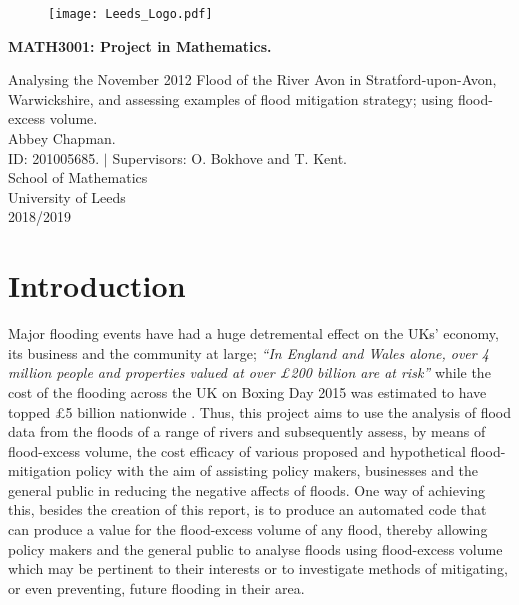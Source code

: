 \documentclass[11pt,a4paper]{article}
\begin{document}

\begin{titlepage}
\begin{center}

\begin{figure}[t]
\raggedleft
\texttt{[image: Leeds\_Logo.pdf]}
\end{figure}
 

\vspace*{5cm}
{\huge \textbf{MATH3001: Project in Mathematics.}}\\
\hrulefill

\vspace*{0.1cm}
{\LARGE Analysing the November 2012 Flood of the River Avon in Stratford-upon-Avon, Warwickshire, and assessing examples of flood mitigation strategy{;} using flood-excess volume.}\\
\vspace{1cm}
{\large Abbey Chapman.}\\
{\large ID: 201005685. $|$ Supervisors: O. Bokhove and T. Kent.}\\
\vfill
School of Mathematics\\
University of Leeds\\
2018/2019
\end{center}
\end{titlepage}

\tableofcontents 
\noindent \hrulefill

\newpage
\section{Introduction}
Major flooding events have had a huge detremental effect on the UKs' economy, its business and the community at large{;} \textit{``In England and Wales alone, over 4 million people and properties valued at over £200 billion are at risk''} \cite{foresight} while the cost of the flooding across the UK on Boxing Day 2015 was estimated to have topped \pounds5 billion nationwide \cite{telegraph}. Thus, this project aims to use the analysis of flood data from the floods of a range of rivers and subsequently assess, by means of flood-excess volume, the cost efficacy of various proposed and hypothetical flood-mitigation policy with the aim of assisting policy makers, businesses and the general public in reducing the negative affects of floods. One way of achieving this, besides the creation of this report, is to produce an automated code that can produce a value for the flood-excess volume of any flood, thereby allowing policy makers and the general public to analyse floods using flood-excess volume which may be pertinent to their interests or to investigate methods of mitigating, or even preventing, future flooding in their area.
\end{document}
